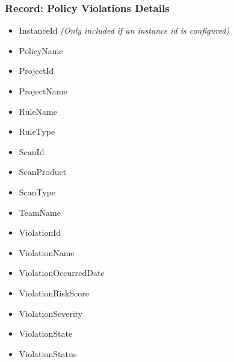 \subsubsection{Record: Policy Violations Details}
\begin{itemize}
    \item InstanceId \textit{(Only included if an instance id is configured)}
    \item PolicyName
    \item ProjectId
    \item ProjectName
    \item RuleName
    \item RuleType
    \item ScanId
    \item ScanProduct
    \item ScanType
    \item TeamName
    \item ViolationId
    \item ViolationName
    \item ViolationOccurredDate
    \item ViolationRiskScore
    \item ViolationSeverity
    \item ViolationState
    \item ViolationStatus
\end{itemize}

